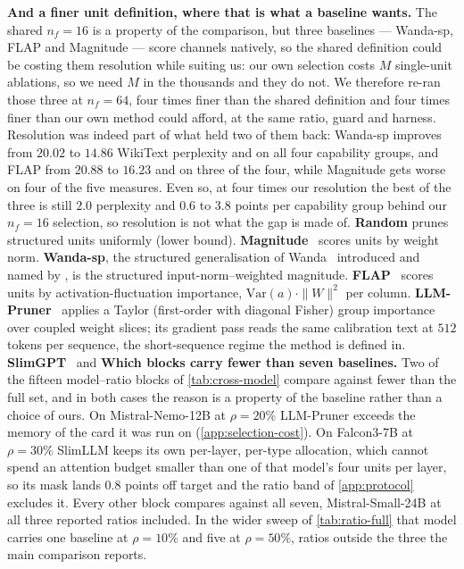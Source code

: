 \textbf{And a finer unit definition, where that is what a baseline wants.} The shared $n_f{=}16$ is a
property of the comparison, but three baselines --- Wanda-sp, FLAP and Magnitude --- score channels
natively, so the shared definition could be costing them resolution while suiting us: our own selection
costs $M$ single-unit ablations, so we need $M$ in the thousands and they do not. We therefore re-ran
those three at $n_f{=}64$, four times finer than the shared definition and four times finer than our own
method could afford, at the same ratio, guard and harness. Resolution was indeed part of what held two
of them back: Wanda-sp improves from $20.02$ to $14.86$ WikiText perplexity and on all four capability
groups, and FLAP from $20.88$ to $16.23$ and on three of the four, while Magnitude gets worse on four of
the five measures. Even so, at four times our resolution the best of the three is still $2.0$ perplexity
and $0.6$ to $3.8$ points per capability group behind our $n_f{=}16$ selection, so resolution is not
what the gap is made of.
\textbf{Random} prunes structured units uniformly (lower bound). \textbf{Magnitude}~\citep{han2015learning}
scores units by weight norm. \textbf{Wanda-sp}, the structured generalisation of Wanda~\citep{sun2024wanda} introduced and named by \citet{an2024flap}, is the structured input-norm--weighted
magnitude. \textbf{FLAP}~\citep{an2024flap} scores units by activation-fluctuation importance,
$\mathrm{Var}(a)\cdot\|W\|^2$ per column. \textbf{LLM-Pruner}~\citep{ma2023llmpruner} applies a Taylor (first-order with diagonal Fisher) group
importance over coupled weight slices; its gradient pass reads the same calibration text at $512$
tokens per sequence, the short-sequence regime the method is defined in. \textbf{SlimGPT}~\citep{ling2024slimgpt} and
\textbf{Which blocks carry fewer than seven baselines.} Two of the fifteen model--ratio blocks of
\cref{tab:cross-model} compare against fewer than the full set, and in both cases the reason is a
property of the baseline rather than a choice of ours. On Mistral-Nemo-12B at $\rho{=}20\%$ LLM-Pruner
exceeds the memory of the card it was run on (\cref{app:selection-cost}). On Falcon3-7B at $\rho{=}30\%$
SlimLLM keeps its own per-layer, per-type allocation, which cannot spend an attention budget smaller
than one of that model's four units per layer, so its mask lands $0.8$ points off target and the ratio
band of \cref{app:protocol} excludes it. Every other block compares against all seven, Mistral-Small-24B
at all three reported ratios included. In the wider sweep of \cref{tab:ratio-full} that model carries
one baseline at $\rho{=}10\%$ and five at $\rho{=}50\%$, ratios outside the three the main comparison
reports.

